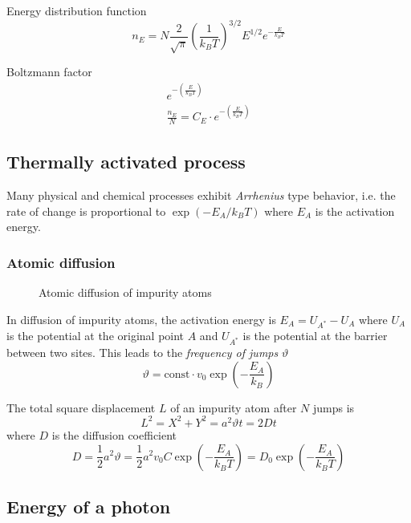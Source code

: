Energy distribution function
\begin{equation}
    n_E = N \frac{2}{\sqrt{\pi}} \left(\frac{1}{k_B T}\right)^{3/2} E^{1/2} e^{-\frac{E}{k_B T}}
\end{equation}

Boltzmann factor
\begin{align}
	e^{-\left(\frac{E}{k_B T}\right)} \\
	\frac{n_E}{N} = C_E \cdot e^{-\left(\frac{E}{k_B T}\right)}
\end{align}

\subsection{Thermally activated process}
Many physical and chemical processes exhibit \emph{Arrhenius} type behavior, i.e. 
the rate of change is proportional to $\exp(-E_A / k_B T)$ where $E_A$ is the activation energy.

\subsubsection{Atomic diffusion}

\begin{figure}[ht]
    \centering
    
    \caption{Atomic diffusion of impurity atoms}
\end{figure}

In diffusion of impurity atoms, the activation energy is $E_A = U_{A^*} - U_A$ where 
$U_A$ is the potential at the original point $A$ and $U_{A^*}$ is the potential at
the barrier between two sites. This leads to the \emph{frequency of jumps} $\vartheta$
\begin{equation}
    \vartheta = \text{const} \cdot v_0 \exp\left(-\frac{E_A}{k_B}\right)
\end{equation}

The total square displacement $L$ of an impurity atom after $N$ jumps is
\begin{equation}
    L^2 = X^2 + Y^2 = a^2 \vartheta t = 2 D t
\end{equation}
where $D$ is the diffusion coefficient
\begin{equation}
    D = \frac{1}{2} a^2 \vartheta = \frac{1}{2} a^2 v_0 C \exp\left(-\frac{E_A}{k_B T}\right) = D_0 \exp\left(-\frac{E_A}{k_B T}\right)
\end{equation}


\subsection{Energy of a photon}

